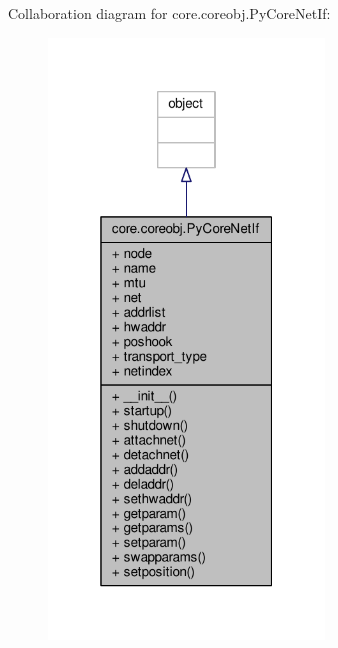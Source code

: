 Collaboration diagram for core.\+coreobj.\+Py\+Core\+Net\+If\+:
\nopagebreak
\begin{figure}[H]
\begin{center}
\leavevmode
\includegraphics[width=208pt]{classcore_1_1coreobj_1_1_py_core_net_if__coll__graph}
\end{center}
\end{figure}
